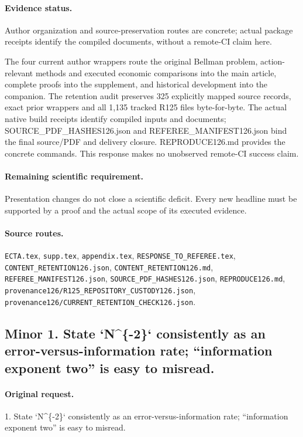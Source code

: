 \paragraph{Evidence status.} Author organization and source-preservation routes are concrete; actual package receipts identify the compiled documents, without a remote-CI claim here.

The four current author wrappers route the original Bellman problem, action-relevant methods and executed economic comparisons into the main article, complete proofs into the supplement, and historical development into the companion. The retention audit preserves 325 explicitly mapped source records, exact prior wrappers and all 1,135 tracked R125 files byte-for-byte. The actual native build receipts identify compiled inputs and documents; SOURCE\_PDF\_HASHES126.json and REFEREE\_MANIFEST126.json bind the final source/PDF and delivery closure. REPRODUCE126.md provides the concrete commands. This response makes no unobserved remote-CI success claim.\par

\paragraph{Remaining scientific requirement.} Presentation changes do not close a scientific deficit. Every new headline must be supported by a proof and the actual scope of its executed evidence.

\paragraph{Source routes.} \nolinkurl{ECTA.tex}, \nolinkurl{supp.tex}, \nolinkurl{appendix.tex}, \nolinkurl{RESPONSE_TO_REFEREE.tex}, \nolinkurl{CONTENT_RETENTION126.json}, \nolinkurl{CONTENT_RETENTION126.md}, \nolinkurl{REFEREE_MANIFEST126.json}, \nolinkurl{SOURCE_PDF_HASHES126.json}, \nolinkurl{REPRODUCE126.md}, \nolinkurl{provenance126/R125_REPOSITORY_CUSTODY126.json}, \nolinkurl{provenance126/CURRENT_RETENTION_CHECK126.json}.

\subsection*{Minor 1. State `N\textasciicircum{}\{-2\}` consistently as an error-versus-information rate; “information exponent two” is easy to misread.}
\paragraph{Original request.} 1. State `N\textasciicircum{}\{-2\}` consistently as an error-versus-information rate; “information exponent two” is easy to misread.

